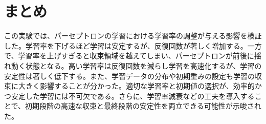 \documentclass[a4j, 12pt]{jarticle}
\begin{document}
\section{まとめ}
この実験では、パーセプトロンの学習における学習率の調整が与える影響を検証した。学習率を下げるほど学習は安定するが、反復回数が著しく増加する。一方で、学習率を上げすぎると収束領域を越えてしまい、パーセプトロンが前後に揺れ動く状態となる。高い学習率は反復回数を減らし学習を高速化するが、学習の安定性は著しく低下する。また、学習データの分布や初期重みの設定も学習の収束に大きく影響することが分かった。適切な学習率と初期値の選択が、効率的かつ安定した学習には不可欠である。さらに、学習率減衰などの工夫を導入することで、初期段階の高速な収束と最終段階の安定性を両立できる可能性が示唆された。
\end{document}

